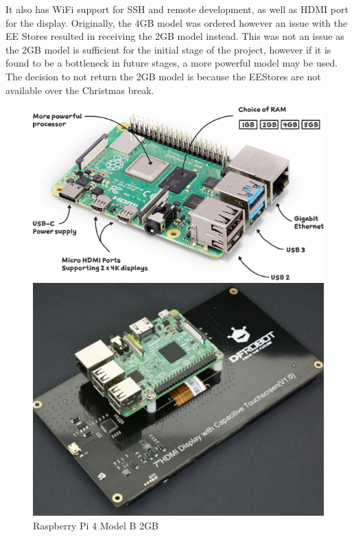 It also has WiFi support for SSH and remote development, as well as HDMI port for the display.
Originally, the 4GB model was ordered however an issue with the EE Stores resulted in receiving the 2GB model instead.
This was not an issue as the 2GB model is sufficient for the initial stage of the project, however if it is found to be a bottleneck
in future stages, a more powerful model may be used. The decision to not return the 2GB model is because the EEStores are not
available over the Christmas break.
\begin{figure}
  \begin{minipage}[t]{0.22\textwidth}
    \centering
    \includegraphics[width=\textwidth]{imgs/pi4_labelled.png}
    \caption{Raspberry Pi 4 Model B 2GB\cite{pi4}}
  \end{minipage}
  \hfill
  \begin{minipage}[t]{0.22\textwidth}
    \centering
    \includegraphics[width=\textwidth]{imgs/dfrobot_screen.jpg}

\end{minipage}
\end{figure}
